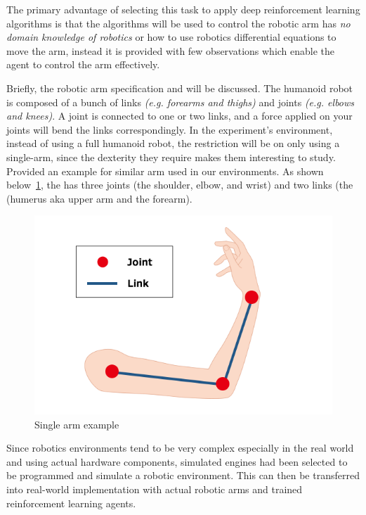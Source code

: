 The primary advantage of selecting this task to apply deep reinforcement learning algorithms is that the algorithms will be used to control the robotic arm has \textit{no domain knowledge of robotics} or how to use robotics differential equations to move the arm, instead it is provided with few observations which enable the agent to control the arm effectively. 

Briefly, the robotic arm specification and will be discussed. The humanoid robot is composed of a bunch of links \textit{(e.g. forearms and thighs)} and joints \textit{ (e.g. elbows and knees)}. A joint is connected to one or two links, and a force applied on your joints will bend the links correspondingly. In the experiment's environment, instead of using a full humanoid robot, the restriction will be on only using a single-arm, since the dexterity they require makes them interesting to study. 
Provided an example for similar arm used in our environments. As shown below~\ref{fig:arm}, the has three joints (the shoulder, elbow, and wrist) and two links (the (humerus aka upper arm and the forearm).

\begin{figure}[!htb]
	\centering
	\includegraphics[width=\linewidth]{figures/arm.png}
	\caption{Single arm example}
	\label{fig:arm}
\end{figure}

Since robotics environments tend to be very complex especially in the real world and using actual hardware components, simulated engines had been selected to be programmed and simulate a robotic environment. This can then be transferred into real-world implementation with actual robotic arms and trained reinforcement learning agents. 

